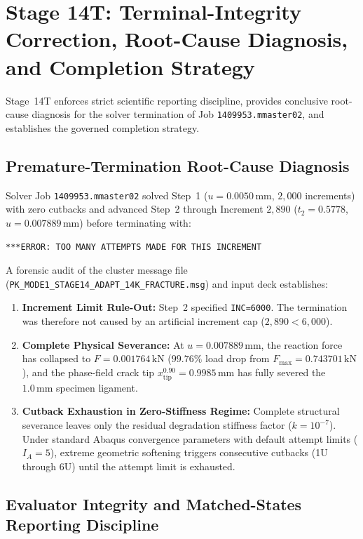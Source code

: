 \section{Stage 14T: Terminal-Integrity Correction, Root-Cause Diagnosis, and Completion Strategy}
\label{sec:stage14t_terminal_integrity}

Stage~14T enforces strict scientific reporting discipline, provides conclusive root-cause diagnosis for the solver termination of Job \texttt{1409953.mmaster02}, and establishes the governed completion strategy.

\subsection{Premature-Termination Root-Cause Diagnosis}
\label{subsec:stage14t_root_cause}

Solver Job \texttt{1409953.mmaster02} solved Step~1 ($u = 0.0050\,\mathrm{mm}$, $2{,}000$ increments) with zero cutbacks and advanced Step~2 through Increment $2{,}890$ ($t_2 = 0.5778$, $u = 0.007889\,\mathrm{mm}$) before terminating with:
\begin{center}
\texttt{***ERROR: TOO MANY ATTEMPTS MADE FOR THIS INCREMENT}
\end{center}
A forensic audit of the cluster message file (\texttt{PK\_MODE1\_STAGE14\_ADAPT\_14K\_FRACTURE.msg}) and input deck establishes:
\begin{enumerate}
    \item \textbf{Increment Limit Rule-Out:} Step~2 specified \texttt{INC=6000}. The termination was therefore not caused by an artificial increment cap ($2{,}890 < 6{,}000$).
    \item \textbf{Complete Physical Severance:} At $u = 0.007889\,\mathrm{mm}$, the reaction force has collapsed to $F = 0.001764\,\mathrm{kN}$ ($99.76\%$ load drop from $F_{\max} = 0.743701\,\mathrm{kN}$), and the phase-field crack tip $x_{\mathrm{tip}}^{0.90} = 0.9985\,\mathrm{mm}$ has fully severed the $1.0\,\mathrm{mm}$ specimen ligament.
    \item \textbf{Cutback Exhaustion in Zero-Stiffness Regime:} Complete structural severance leaves only the residual degradation stiffness factor ($k = 10^{-7}$). Under standard Abaqus convergence parameters with default attempt limits ($I_A = 5$), extreme geometric softening triggers consecutive cutbacks (1U through 6U) until the attempt limit is exhausted.
\end{enumerate}

\subsection{Evaluator Integrity and Matched-States Reporting Discipline}
\label{subsec:stage14t_discipline}

